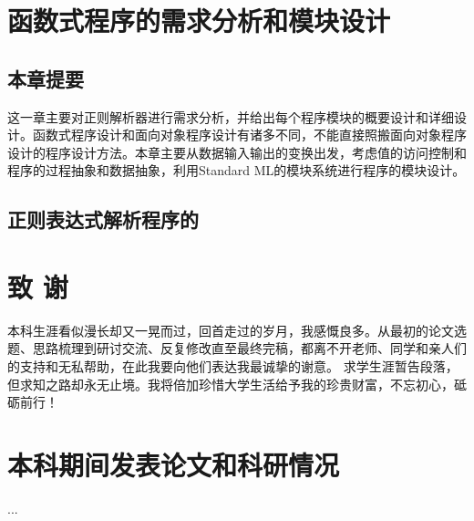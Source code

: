 \documentclass[openany,oneside]{book}
\theoremstyle{definition}
\theoremstyle{definition}
\begin{document}
	\chapter{函数式程序的需求分析和模块设计}
	\section{本章提要}
	这一章主要对正则解析器进行需求分析，并给出每个程序模块的概要设计和详细设计。函数式程序设计和面向对象程序设计有诸多不同，不能直接照搬面向对象程序设计的程序设计方法。本章主要从数据输入输出的变换出发，考虑值的访问控制和程序的过程抽象和数据抽象，利用Standard ML的模块系统进行程序的模块设计。
	\section{正则表达式解析程序的}

\clearpage
{}
{}

\chapter*{致 \qquad 谢}
\thispagestyle{empty}
本科生涯看似漫长却又一晃而过，回首走过的岁月，我感慨良多。从最初的论文选题、思路梳理到研讨交流、反复修改直至最终完稿，都离不开老师、同学和亲人们的支持和无私帮助，在此我要向他们表达我最诚挚的谢意。
求学生涯暂告段落，但求知之路却永无止境。我将倍加珍惜大学生活给予我的珍贵财富，不忘初心，砥砺前行！
\chapter*{本科期间发表论文和科研情况}
\thispagestyle{empty}

...
\end{document}
